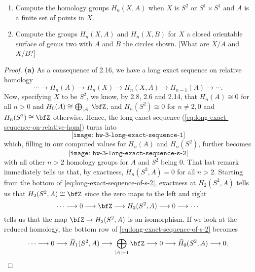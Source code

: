 \begin{problem}[Hatcher {\S}2.1, Ex.\@ 17]
\begin{enumerate}[label=(\alph*)]
\item Compute the homology groups $H_n(X,A)$ when $X$ is $S^2$ or
  $S^1\times S^1$ and $A$ is a finite set of points in $X$.
\item Compute the groups $H_n(X,A)$ and $H_n(X,B)$ for $X$ a closed
  orientable surface of genus two with $A$ and $B$ the circles shown. [What
  are $X/A$ and $X/B$?]
\end{enumerate}
\end{problem}
\begin{proof}
\textbf{(a)} As a consequence of 2.16, we have a long exact sequence on relative
homology
\begin{equation}
\label{eq:long-exact-sequence-on-relative-hom}
\cdots\longrightarrow
H_n(A)\longrightarrow
H_n(X)\longrightarrow
H_n(X,A)\longrightarrow
H_{n-1}(A)\longrightarrow
\cdots.
\end{equation}
Now, specifying $X$ to be $S^2$, we know, by 2.8, 2.6 and 2.14, that
$H_n(A)\cong 0$ for all $n>0$ and $H_0(A)\cong \bigoplus_{|A|}\bfZ$, and
$H_n(S^2)\cong 0$ for $n\neq 2,0$ and $H_n(S^2)\cong\bfZ$ otherwise. Hence,
the long exact sequence (\ref{eq:long-exact-sequence-on-relative-hom})
turns into
\begin{equation}
\label{eq:long-exact-sequence}
\texttt{[image: hw-3-long-exact-sequence-1]}
\end{equation}
which, filling in our computed values for $H_n(A)$ and $H_n(S^2)$, further
becomes
\begin{equation}
\label{eq:long-exact-sequence-of-s-2}
\texttt{[image: hw-3-long-exact-sequence-s-2]}
\end{equation}
with all other $n>2$ homology groups for $A$ and $S^2$ being $0$. That last
remark immediately tells us that, by exactness, $H_n(S^2,A)=0$ for all
$n>2$. Starting from the bottom of \eqref{eq:long-exact-sequence-of-s-2},
exactness at $H_2(S^2,A)$ tells us that $H_2(S^2,A)\cong\bfZ$ since the
zero maps to the left and right
\[
\cdots\longrightarrow 0\longrightarrow \bfZ\longrightarrow H_2(S^2,A)\longrightarrow 0\longrightarrow\cdots
\]
tells us that the map $\bfZ\to H_2(S^2,A)$ is an isomorphism. If we look at
the reduced homology, the bottom row of
\eqref{eq:long-exact-sequence-of-s-2} becomes
\[
\cdots\longrightarrow
0\longrightarrow
\widetilde H_1(S^2,A)\longrightarrow
\bigoplus_{|A|-1}\bfZ\longrightarrow
0\longrightarrow\widetilde H_0(S^2,A)
\longrightarrow 0.
\]
\end{proof}
